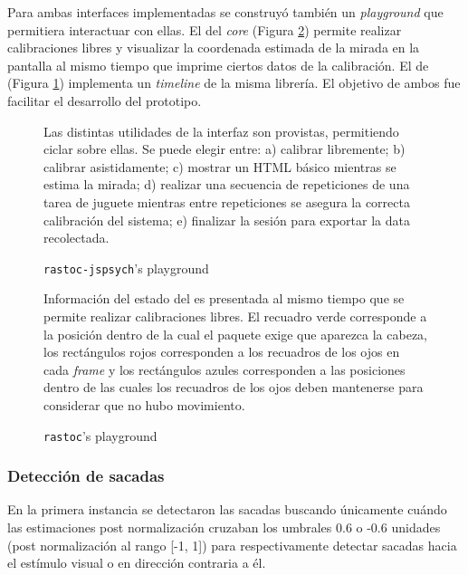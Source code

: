 Para ambas interfaces implementadas se construyó también un \textit{playground}
que permitiera interactuar con ellas.
El del \textit{core} (Figura \ref{fig:rastoc-playground}) permite realizar
calibraciones libres y visualizar la coordenada estimada de la mirada en la
pantalla al mismo tiempo que imprime ciertos datos de la calibración.
El de \jspsych (Figura \ref{fig:rastoc-jspsych-playground}) implementa un
\textit{timeline} de la misma librería.
El objetivo de ambos fue facilitar el desarrollo del prototipo.

\begin{figure}
    \centering
    \caption{\texttt{rastoc-jspsych}’s playground}
    Las distintas utilidades de la interfaz \jspsych son provistas, permitiendo
    ciclar sobre ellas.
    Se puede elegir entre:
    a) calibrar libremente;
    b) calibrar asistidamente;
    c) mostrar un HTML básico mientras se estima la mirada;
    d) realizar una secuencia de repeticiones de una tarea de juguete mientras
    entre repeticiones se asegura la correcta calibración del sistema;
    e) finalizar la sesión para exportar la data recolectada.
    \label{fig:rastoc-jspsych-playground}
\end{figure}

\begin{figure}
    \centering
    \caption{\texttt{rastoc}’s playground}
    Información del estado del \eyetracker es presentada al mismo tiempo que se
    permite realizar calibraciones libres.
    El recuadro verde corresponde a la posición dentro de la cual el paquete
    \webgazer exige que aparezca la cabeza, los rectángulos rojos corresponden
    a los recuadros de los ojos en cada \textit{frame} y los rectángulos azules
    corresponden a las posiciones dentro de las cuales los recuadros de los
    ojos deben mantenerse para considerar que no hubo movimiento.
    \label{fig:rastoc-playground}
\end{figure}

\subsubsection{Detección de sacadas}

En la primera instancia se detectaron las sacadas buscando únicamente cuándo
las estimaciones post normalización cruzaban los umbrales 0.6 o -0.6 unidades
(post normalización al rango [-1, 1]) para respectivamente detectar sacadas
hacia el estímulo visual o en dirección contraria a él.

